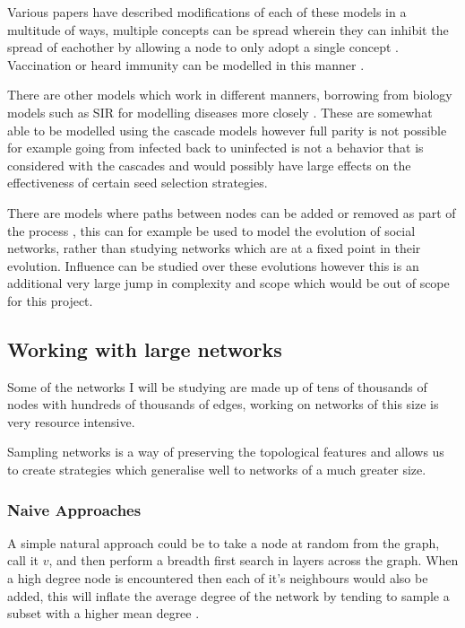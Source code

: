 \documentclass{article}
\begin{document}
Various papers have described modifications of each of these models in a multitude of ways,
multiple concepts can be spread wherein they can inhibit the spread of eachother by allowing a node to only adopt a single concept \cite{griffiths17LimitiingConcept,goyal2012competitivecontagionnetworks}.
Vaccination or heard immunity can be modelled in this manner \cite{griffiths17LimitiingConcept}.

There are other models which work in different manners, borrowing from biology models such as SIR for modelling diseases more closely \cite{kuperman2013invited}. These are somewhat able to be modelled using the cascade models however full parity is not possible for example going from infected back to uninfected is not a behavior that is considered with the cascades and would possibly have large effects on the effectiveness of certain seed selection strategies.

There are models where paths between nodes can be added or removed as part of the process \cite{sekara2016fundamental}, this can for example be used to model the evolution of social networks, rather than studying networks which are at a fixed point in their evolution.
Influence can be studied over these evolutions however this is an additional very large jump in complexity and scope which would be out of scope for this project.

\subsection{Working with large networks}

Some of the networks I will be studying are made up of tens of thousands of nodes with hundreds of thousands of edges, working on networks of this size is very resource intensive.

Sampling networks is a way of preserving the topological features and allows us to create strategies which generalise well to networks of a much greater size.

\subsubsection{Naive Approaches}
A simple natural approach could be to take a node at random from the graph, call it $v$, and then perform a breadth first search in layers across the graph.
When a high degree node is encountered then each of it's neighbours would also be added, this will inflate the average degree of the network by tending to sample a subset with a higher mean degree \cite{Wang2011UnderstandingGS}.
\end{document}

